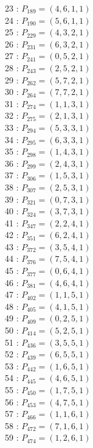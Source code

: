\documentclass{article}
\begin{document}
{\begin{multicols}{3}
23 : $P_{189}=( 4, 6, 1, 1 )$\\
24 : $P_{190}=( 5, 6, 1, 1 )$\\
25 : $P_{229}=( 4, 3, 2, 1 )$\\
26 : $P_{231}=( 6, 3, 2, 1 )$\\
27 : $P_{241}=( 0, 5, 2, 1 )$\\
28 : $P_{243}=( 2, 5, 2, 1 )$\\
29 : $P_{262}=( 5, 7, 2, 1 )$\\
30 : $P_{264}=( 7, 7, 2, 1 )$\\
31 : $P_{274}=( 1, 1, 3, 1 )$\\
32 : $P_{275}=( 2, 1, 3, 1 )$\\
33 : $P_{294}=( 5, 3, 3, 1 )$\\
34 : $P_{295}=( 6, 3, 3, 1 )$\\
35 : $P_{298}=( 1, 4, 3, 1 )$\\
36 : $P_{299}=( 2, 4, 3, 1 )$\\
37 : $P_{306}=( 1, 5, 3, 1 )$\\
38 : $P_{307}=( 2, 5, 3, 1 )$\\
39 : $P_{321}=( 0, 7, 3, 1 )$\\
40 : $P_{324}=( 3, 7, 3, 1 )$\\
41 : $P_{347}=( 2, 2, 4, 1 )$\\
42 : $P_{351}=( 6, 2, 4, 1 )$\\
43 : $P_{372}=( 3, 5, 4, 1 )$\\
44 : $P_{376}=( 7, 5, 4, 1 )$\\
45 : $P_{377}=( 0, 6, 4, 1 )$\\
46 : $P_{381}=( 4, 6, 4, 1 )$\\
47 : $P_{402}=( 1, 1, 5, 1 )$\\
48 : $P_{405}=( 4, 1, 5, 1 )$\\
49 : $P_{409}=( 0, 2, 5, 1 )$\\
50 : $P_{414}=( 5, 2, 5, 1 )$\\
51 : $P_{436}=( 3, 5, 5, 1 )$\\
52 : $P_{439}=( 6, 5, 5, 1 )$\\
53 : $P_{442}=( 1, 6, 5, 1 )$\\
54 : $P_{445}=( 4, 6, 5, 1 )$\\
55 : $P_{450}=( 1, 7, 5, 1 )$\\
56 : $P_{453}=( 4, 7, 5, 1 )$\\
57 : $P_{466}=( 1, 1, 6, 1 )$\\
58 : $P_{472}=( 7, 1, 6, 1 )$\\
59 : $P_{474}=( 1, 2, 6, 1 )$\\

\end{multicols}}
\end{document}
